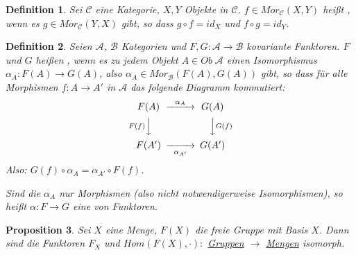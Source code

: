 \documentclass[a4paper,10pt,german]{scrbook}
\theoremstyle{saetze}
\theoremstyle{definitionen}
\newtheorem{Def}{Definition}[section]
\newtheorem{Prop}[Def]{Proposition}
\begin{document}
\begin{Def}
Sei $\mathcal C$ eine Kategorie, $X,Y$ Objekte in $\mathcal C$. $f\in Mor_{\mathcal C}(X,Y)$ heißt , wenn es $g\in Mor_{\mathcal C}(Y,X)$ gibt, so dass $g \circ f = id_X$ und $f \circ g = id_Y$.
\end{Def}

\begin{Def}
Seien $\mathcal A$, $\mathcal B$ Kategorien und $F,G:\mathcal A \to \mathcal B$ kovariante Funktoren. $F$ und $G$ heißen , wenn es zu jedem Objekt $A\in Ob\;\mathcal A$ einen Isomorphismus $\alpha_A: F(A) \to G(A)$, also $\alpha_A\in Mor_{\mathcal B}(F(A),G(A))$ gibt, so dass für alle Morphismen $f:A \to A'$ in $\mathcal A$ das folgende Diagramm kommutiert:
\[
\begin{CD}
F(A) @>\alpha_A>> G(A) \\
@VF(f)VV         @VVG(f)V \\
F(A') @>>\alpha_{A'}> G(A') 
\end{CD}
\]
Also: $G(f)\circ \alpha_A = \alpha_{A'} \circ F(f)$.

Sind die $\alpha_A$ nur Morphismen (also nicht notwendigerweise Isomorphismen), so heißt $\alpha: F\to G$ eine  von Funktoren.
\label{funktorisomorphismus}
\end{Def}

\begin{Prop}
Sei $X$ eine Menge, $F(X)$ die freie Gruppe mit Basis $X$. Dann sind die Funktoren $F_X$ und $Hom(F(X),\cdot):$ \underline{Gruppen} $\to$ \underline{Mengen} isomorph.
\end{Prop}

\end{document}
